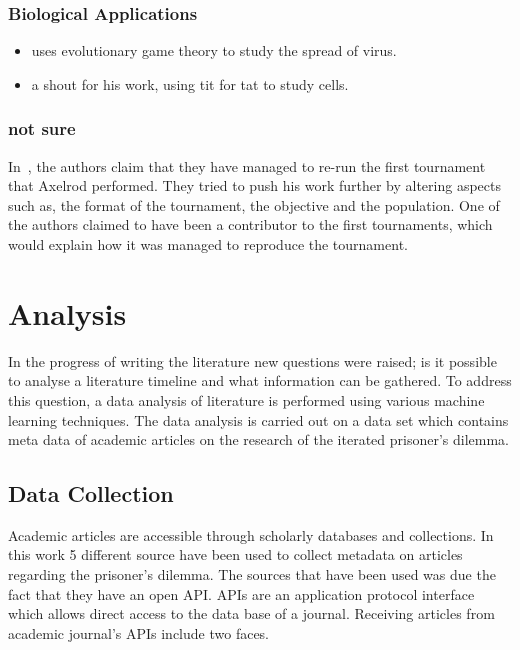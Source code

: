 \documentclass{article}
\begin{document}
\subsubsection{Biological Applications}
\begin{itemize}
    \item \cite{Turner1999} uses evolutionary game theory to study the spread of
    virus.
    \item \cite{Douglas2011} a shout for his work, using tit for tat to study cells.
\end{itemize}
\subsubsection{not sure}
In~\cite{Rapoport2015}, the authors claim that they have managed to 
re-run the first tournament that Axelrod performed. They tried to push his work
further by altering aspects such as, the format of the tournament, the objective
and the population. One of the authors claimed to have been a contributor
to the first tournaments, which would explain how it was managed to reproduce
the tournament.

\section{Analysis}\label{section:analysis}

In the progress of writing the literature new questions were raised; is it 
possible to analyse a literature timeline and what information can be gathered. 
To address this question, a data analysis of literature is performed using various
machine learning techniques. The data analysis is carried out on a data set which
contains meta data of academic articles on the research of the iterated prisoner's 
dilemma.

\subsection{Data Collection}

Academic articles are accessible through scholarly databases and collections.
In this work 5 different source have been used to collect metadata on articles
regarding the prisoner's dilemma. The sources that have been used was due the fact
that they have an open API. APIs are an application protocol interface which
allows direct access to the data base of a journal. Receiving articles from
academic journal's APIs include two faces.
\end{document}
